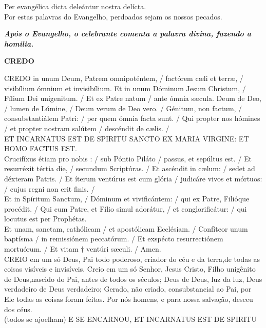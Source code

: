 \begin{multicols}{2}
	\noindent
	Per evangélica dicta deleántur nostra delícta. 
	\\Por estas palavras do Evangelho, perdoados sejam os nossos pecados.
\end{multicols}
\begin{center}
	\textbf{\textit{Após o Evangelho, o celebrante comenta a palavra divina, fazendo a homilia.}}
\end{center}
\newpage
\begin{center}
	\textbf{CREDO}
\end{center}
\begin{multicols}{2}
	\noindent
	CREDO in unum Deum, Patrem
	omnipoténtem, / factórem cæli et terræ, /
	visibílium ómnium et invisibílium.
	Et in unum Dóminum Jesum Christum, /
	Fílium Dei unigenitum. / Et ex Patre
	natum / ante ómnia sæcula. Deum de Deo,
	/ lumen de Lúmine, / Deum verum de Deo
	vero. / Génitum, non factum, /
	consubstantiálem Patri: / per quem ómnia
	facta sunt. / Qui propter nos hómines / et
	propter nostram salútem / descéndit de
	cælis. /
	\\ ET INCARNATUS EST DE SPIRITU
	SANCTO EX MARIA VIRGINE: ET
	HOMO FACTUS EST.
	\\Crucifíxus étiam pro nobis : / sub Póntio
	Piláto / passus, et sepúltus est. / Et
	resurréxit tértia die, / secundum
	Scriptúras. / Et ascéndit in cælum: / sedet
	ad déxteram Patris. / Et íterum ventúrus
	est cum glória / judicáre vivos et mórtuos:
	/ cujus regni non erit finis. /
	\\Et in Spíritum Sanctum, / Dóminum et
	vivificántem: / qui ex Patre, Filióque
	procédit. / Qui cum Patre, et Fílio simul
	adorátur, / et conglorificátur: / qui locutus
	est per Prophétas.
	\\ Et unam, sanctam, cathólicam / et
	apostólicam Ecclésiam. / Confíteor unum
	baptísma / in remissiónem peccatórum. /
	Et exspécto resurrectiónem mortuórum. /
	Et vitam $\dag$ ventúri sæculi. / Amen.
	\\ CREIO em um só Deus, Pai todo
	poderoso, criador do céu e da terra,de
	todas as coisas visíveis e invisíveis.
	Creio em um só Senhor, Jesus Cristo,
	Filho unigênito de Deus,nascido do Pai,
	antes de todos os séculos; Deus de
	Deus, luz da luz, Deus verdadeiro de
	Deus verdadeiro; Gerado, não criado,
	consubstancial ao Pai, por Ele todas as
	coisas foram feitas. Por nós homens, e
	para nossa salvação, desceu dos céus.
	\\(todos se ajoelham) E SE ENCARNOU, ET INCARNATUS EST DE SPIRITU

\end{multicols}
